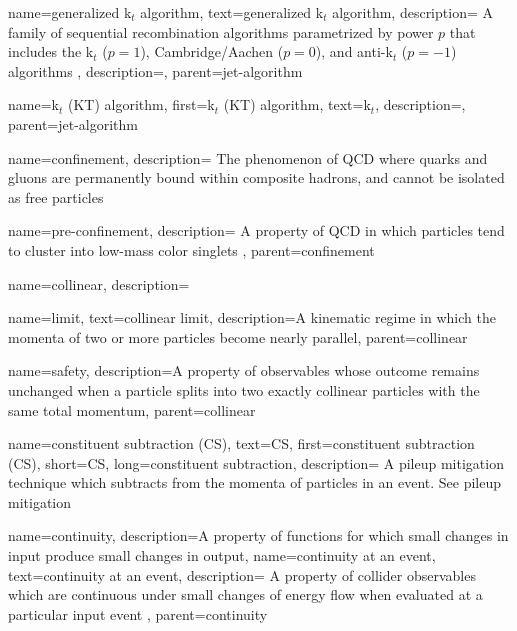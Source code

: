     {
        name=generalized k\(_t\) algorithm,
        text={generalized k\(_t\) algorithm},
        description={
            A family of sequential recombination algorithms parametrized by power \(p\) that includes the k\(_t\) (\(p=1\)), Cambridge/Aachen (\(p=0\)), and anti-k\(_t\) (\(p=-1\)) algorithms
        },
        description={},
        parent=jet-algorithm
    }


    {
        name=k\(_t\) (KT) algorithm,
        first={k\(_t\) (KT) algorithm},
        text={k\(_t\)},
        description={},
        parent=jet-algorithm
    }



{
    name=confinement,
    description={
        The phenomenon of QCD where quarks and gluons are permanently bound within composite hadrons, and cannot be isolated as free particles
    }
}

    {
        name=pre-confinement,
        description={
            A property of QCD in which particles tend to cluster into low-mass color singlets
        },
        parent=confinement
    }




{
    name=collinear,
    description={}
}

    {
        name=limit,
        text=collinear limit,
        description={A kinematic regime in which the momenta of two or more particles become nearly parallel},
        parent=collinear
    }


    {
        name=safety,
        description={A property of observables whose outcome remains unchanged when a particle splits into two exactly collinear particles with the same total momentum},
        parent=collinear
    }

{
    name=constituent subtraction (CS),
    text=CS,
    first=constituent subtraction (CS),
    short=CS,
    long=constituent subtraction,
    description={
        A pileup mitigation technique which subtracts from the momenta of particles in an event. See pileup mitigation
    }
}


{
  name=continuity,
  description={A property of functions for which small changes in input produce small changes in output},
}
    {
        name=continuity at an event,
        text=continuity at an event,
        description={
            A property of collider observables which are continuous under small changes of energy flow when evaluated at a particular input event
        },
        parent=continuity
    }

